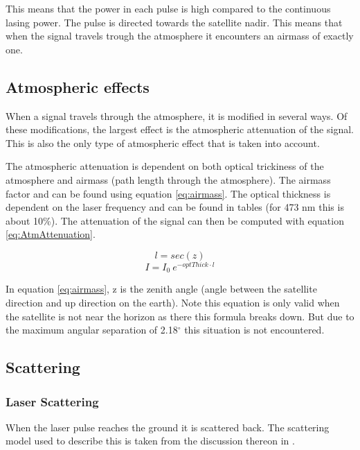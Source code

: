 This means that the power in each pulse is high compared to the continuous lasing power. The pulse is directed towards the satellite nadir. This means that when the signal travels trough the atmosphere it encounters an airmass of exactly one.

\subsection{Atmospheric effects}

When a signal travels through the atmosphere, it is modified in several ways. Of these modifications, the largest effect is the atmospheric attenuation of the signal. This is also the only type of atmospheric effect that is taken into account.

The atmospheric attenuation is dependent on both optical trickiness of the atmosphere and airmass (path length through the atmosphere). The airmass factor and can be found using equation \ref{eq:airmass}. The optical thickness is dependent on the laser frequency and can be found in tables (for 473 nm this is about 10\%). The attenuation of the signal can then be computed with equation \ref{eq:AtmAttenuation}.

\begin{equation}
	l = sec (z)
	\label{eq:airmass}
\end{equation}
\begin{equation}
	I = I_0 \: e^{ -optThick \cdot l }
	\label{eq:AtmAttenuation}
\end{equation}

In equation \ref{eq:airmass}, z is the zenith angle (angle between the satellite direction and up direction on the earth). Note this equation is only valid when the satellite is not near the horizon as there this formula breaks down. But due to the maximum angular separation of 2.18$^\circ$ this situation is not encountered.

\subsection{Scattering}
\subsubsection{Laser Scattering}
\label{scatter}
When the laser pulse reaches the ground it is scattered back. The scattering model used to describe this is taken from the discussion thereon in \cite{rees}. 

